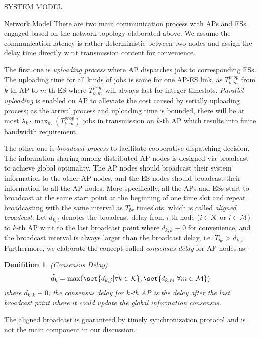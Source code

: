 \documentclass[10pt, conference, letterpaper]{IEEEtran}
\newtheorem{definition}{Denifition}
\DeclarePairedDelimiter\set\{\}
\newcommand{\apSet}{\mathcal{K}}
\newcommand{\esSet}{\mathcal{M}}
\begin{document}
\begin{section}{SYSTEM MODEL}
\begin{subsection}{Network Model}
            There are two main communication process with APs and ESs engaged based on the network topology elaborated above. We assume the communication latency is rather deterministic between two nodes and assign the delay time directly w.r.t transmission content for convenience.

            The first one is \emph{uploading process} where AP dispatches jobs to corresponding ESs. The uploading time for all kinds of jobs is same for one AP-ES link, as $T^{prop}_{k,m}$ from $k$-th AP to $m$-th ES where $T^{prop}_{k,m}$ will always last for integer timeslots. \emph{Parallel uploading} is enabled on AP to alleviate the cost caused by serially uploading process; as the arrival process and uploading time is bounded, there will be at most $\lambda_k \cdot \max_m(T^{prop}_{k,m})$ jobs in transmission on $k$-th AP which results into finite bandwidth requirement.
            
            The other one is \emph{broadcast process} to facilitate cooperative dispatching decision.
            The information sharing among distributed AP nodes is designed via broadcast to achieve global optimality. The AP nodes should broadcast their system information to the other AP nodes, and the ES nodes should broadcast their information to all the AP nodes. More specifically, all the APs and ESs start to broadcast at the same start point at the beginning of one time slot and repeat broadcasting with the same interval as $T_{br}$ timeslots, which is called \emph{aligned broadcast}. Let $d_{k,i}$ denotes the broadcast delay from $i$-th node ($i\in\apSet$ or $i\in\esSet$) to $k$-th AP w.r.t to the last broadcast point where $d_{k,k} \equiv 0$ for convenience, and the broadcast interval is always larger than the broadcast delay, i.e. $T_{br} > d_{k,i}$.
            Furthermore, we elaborate the concept called \emph{consensus delay} for AP nodes as:
            \begin{definition}
                (Consensus Delay).
                \begin{align}
                    \hat{d}_k = \max(\set{d_{k,j}|\forall k\in\apSet}, \set{d_{k,m}|\forall m\in\esSet})
                \end{align}
                where $d_{k,k} \equiv 0$; the consensus delay for $k$-th AP is the delay after the last broadcast point where it could update the global information consensus.
            \end{definition}
            The aligned broadcast is guaranteed by timely synchronization protocol and is not the main component in our discussion.
        \end{subsection}


\end{section}
\end{document}
